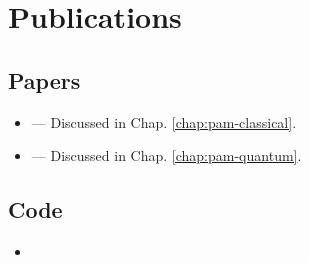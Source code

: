 \chapter*{Publications}

	\section*{Papers}
	\begin{itemize}
		\item {} --- Discussed in Chap. \ref{chap:pam-classical}.
		\item {} --- Discussed in Chap. \ref{chap:pam-quantum}.
	\end{itemize}

	\section*{Code}
	\begin{itemize}
		\item {}
	\end{itemize}